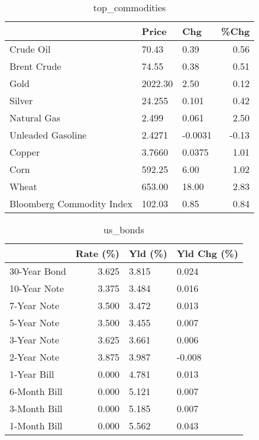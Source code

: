 \documentclass{article}%
\begin{document}
\begin{table}[htbp]%
\caption{top\_commodities}%
\centering%
\begin{adjustbox}{width=1\textwidth}%
\begin{tabular}{lllr}
\toprule
                          &   Price &     Chg &  \%Chg \\
\midrule
               Crude Oil  &   70.43 &    0.39 &  0.56 \\
             Brent Crude  &   74.55 &    0.38 &  0.51 \\
                    Gold  & 2022.30 &    2.50 &  0.12 \\
                  Silver  &  24.255 &   0.101 &  0.42 \\
             Natural Gas  &   2.499 &   0.061 &  2.50 \\
       Unleaded Gasoline  &  2.4271 & -0.0031 & -0.13 \\
                  Copper  &  3.7660 &  0.0375 &  1.01 \\
                    Corn  &  592.25 &    6.00 &  1.02 \\
                   Wheat  &  653.00 &   18.00 &  2.83 \\
Bloomberg Commodity Index &  102.03 &    0.85 &  0.84 \\
\bottomrule
\end{tabular}
%
\end{adjustbox}%
\end{table}

%


\begin{table}[htbp]%
\caption{us\_bonds}%
\centering%
\begin{adjustbox}{width=1\textwidth}%
\begin{tabular}{lrll}
\toprule
             &  Rate (\%) & Yld (\%) & Yld Chg (\%) \\
\midrule
30-Year Bond &     3.625 &   3.815 &       0.024 \\
10-Year Note &     3.375 &   3.484 &       0.016 \\
 7-Year Note &     3.500 &   3.472 &       0.013 \\
 5-Year Note &     3.500 &   3.455 &       0.007 \\
 3-Year Note &     3.625 &   3.661 &       0.006 \\
 2-Year Note &     3.875 &   3.987 &      -0.008 \\
 1-Year Bill &     0.000 &   4.781 &       0.013 \\
6-Month Bill &     0.000 &   5.121 &       0.007 \\
3-Month Bill &     0.000 &   5.185 &       0.007 \\
1-Month Bill &     0.000 &   5.562 &       0.043 \\
\bottomrule
\end{tabular}
%
\end{adjustbox}%
\end{table}
\end{document}
